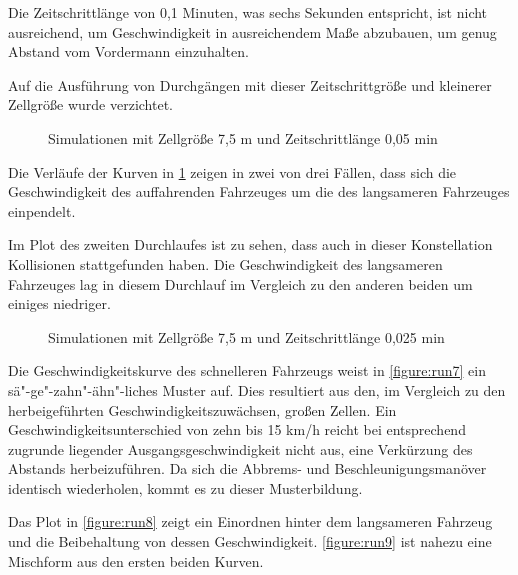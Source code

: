 Die Zeitschrittlänge von 0,1 Minuten, was sechs Sekunden entspricht, ist nicht ausreichend, um Geschwindigkeit in ausreichendem Maße abzubauen, um genug Abstand vom Vordermann einzuhalten.

Auf die Ausführung von Durchgängen mit dieser Zeitschrittgröße und kleinerer Zellgröße wurde verzichtet.

\begin{figure}[hptb]
  \centering 
   \qquad 
   \qquad 
  \caption{Simulationen mit Zellgröße 7,5 m und Zeitschrittlänge 0,05 min} 
  \label{figure:run4-6}
\end{figure}

Die Verläufe der Kurven in \cref{figure:run4-6} zeigen in zwei von drei Fällen, dass sich die Geschwindigkeit des auffahrenden Fahrzeuges um die des langsameren Fahrzeuges einpendelt.

Im Plot des zweiten Durchlaufes ist zu sehen, dass auch in dieser Konstellation Kollisionen stattgefunden haben.
Die Geschwindigkeit des langsameren Fahrzeuges lag in diesem Durchlauf im Vergleich zu den anderen beiden um einiges niedriger.

\begin{figure}[hptb]
  \centering 
   \qquad 
   \qquad 
  \caption{Simulationen mit Zellgröße 7,5 m und Zeitschrittlänge 0,025 min} 
  \label{figure:run7-9}
\end{figure}

Die Geschwindigkeitskurve des schnelleren Fahrzeugs weist in \cref{figure:run7} ein sä"-ge"-zahn"-ähn"-liches Muster auf.
Dies resultiert aus den, im Vergleich zu den herbeigeführten Geschwindigkeitszuwächsen, großen Zellen.
Ein Geschwindigkeitsunterschied von zehn bis 15 km/h reicht bei entsprechend zugrunde liegender Ausgangsgeschwindigkeit nicht aus, eine Verkürzung des Abstands herbeizuführen.
Da sich die Abbrems- und Beschleunigungsmanöver identisch wiederholen, kommt es zu dieser Musterbildung.

Das Plot in \cref{figure:run8} zeigt ein Einordnen hinter dem langsameren Fahrzeug und die Beibehaltung von dessen Geschwindigkeit.
\cref{figure:run9} ist nahezu eine Mischform aus den ersten beiden Kurven.


